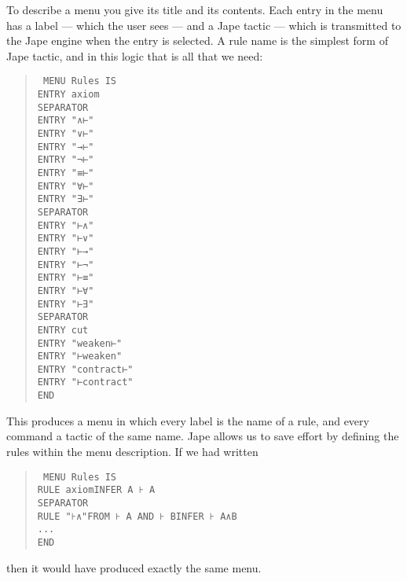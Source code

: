 To describe a menu you give its title and its contents. Each entry in the menu has a label --- which the user sees --- and a Jape tactic --- which is transmitted to the Jape engine when the entry is selected. A rule name is the simplest form of Jape tactic, and in this logic that is all that we need:
\begin{quote}\tt\small
MENU Rules IS\\
\tab   ENTRY axiom\\
\tab   SEPARATOR\\
\tab   ENTRY "∧⊢"\\
\tab   ENTRY "∨⊢"\\
\tab   ENTRY "→⊢"\\
\tab   ENTRY "¬⊢"\\
\tab   ENTRY "≡⊢"\\
\tab   ENTRY "∀⊢"\\
\tab   ENTRY "∃⊢"\\
\tab   SEPARATOR\\
\tab   ENTRY "⊢∧"\\
\tab   ENTRY "⊢∨"\\
\tab   ENTRY "⊢→"\\
\tab   ENTRY "⊢¬"\\
\tab   ENTRY "⊢≡"\\
\tab   ENTRY "⊢∀"\\
\tab   ENTRY "⊢∃"\\
\tab   SEPARATOR\\
\tab   ENTRY cut   \\
\tab   ENTRY "weaken⊢"\\
\tab   ENTRY "⊢weaken"\\
\tab   ENTRY "contract⊢"\\
\tab   ENTRY "⊢contract"\\
END
\end{quote}

This produces a menu in which every label is the name of a rule, and every command a tactic of the same name. Jape allows us to save effort by defining the rules within the menu description. If we had written
\begin{quote}\tt\small
MENU Rules IS\\
\tab RULE axiom\tab INFER A ⊦ A\\
\tab SEPARATOR\\
\tab RULE "⊦∧"\tab FROM ⊦ A AND ⊦ B\tab INFER ⊦ A∧B\\
\tab ...\\
END
\end{quote}
then it would have produced exactly the same menu.


